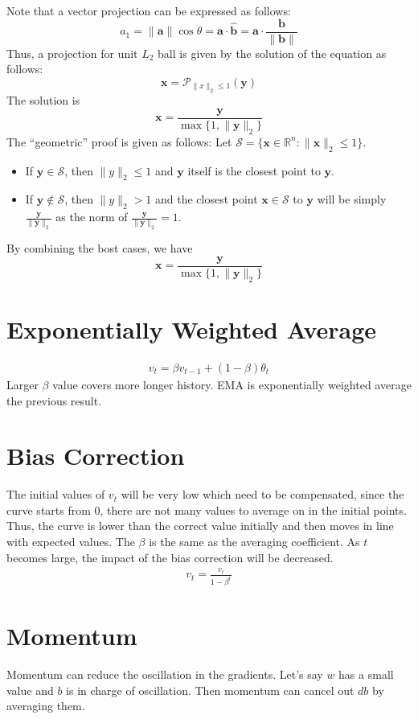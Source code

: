 Note that a vector projection can be expressed as follows:
$$a_1 = \|\mathbf{a}\|\cos \theta = \mathbf{a}\cdot \hat{\mathbf{b}} = \mathbf{a}\cdot \frac{\mathbf{b}}{\|\mathbf{b}\|}$$
Thus, a projection for unit $L_2$ ball is given by the solution of the equation as follows:
$$\mathbf{x} = \mathcal{P}_{\|x\|_2\leq 1}(\mathbf{y})$$
The solution is
$$\mathbf{x} = \frac{\mathbf{y}}{\max \{1,\|\mathbf{y}\|_2\}}$$
The ``geometric'' proof is given as follows: Let $\mathcal{S} = \{\mathbf{x}\in \mathbb{R}^n: \|\mathbf{x}\|_2 \leq 1\}.$
\begin{itemize}
		\item If $\mathbf{y}\in \mathcal{S}$, then $\|y\|_2\leq 1$ and $\mathbf{y}$ itself is the closest point to $\mathbf{y}$.
		\item If $\mathbf{y}\notin \mathcal{S}$, then $\|y\|_2> 1$ and the closest point $\mathbf{x}\in \mathcal{S}$ to $\mathbf{y}$ will be simply $\frac{\mathbf{y}}{\|\mathbf{y}\|_2}$ as the norm of $\frac{\mathbf{y}}{\|\mathbf{y}\|_2}=1$.
\end{itemize}
By combining the bost cases, we have
$$\mathbf{x} = \frac{\mathbf{y}}{\max \{1,\|\mathbf{y}\|_2\}}$$


\section{Exponentially Weighted Average}
\begin{align*}
    v_t = \beta v_{t-1} + (1-\beta) \theta_t
\end{align*}
Larger $\beta$ value covers more longer history. EMA is exponentially weighted average the previous result. 

\section{Bias Correction}
The initial values of $v_t$ will be very low which need to be compensated, since the curve starts from 0, there are not many values to average on in the initial points. Thus, the curve is lower than the correct value initially and then moves in line with expected values. The $\beta$ is the same as the averaging coefficient. As $t$ becomes large, the impact of the bias correction will be decreased. 
\begin{align*}
    v_t = \frac{v_t}{1-\beta^t}
\end{align*}


\section{Momentum}
Momentum can reduce the oscillation in the gradients. Let's say $w$ has a small value and $b$ is in charge of oscillation. Then momentum can cancel out $db$ by averaging them. 

